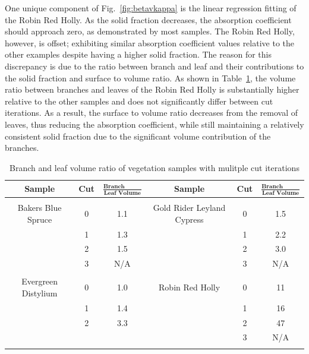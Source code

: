 \documentclass[12pt]{article}
\newcommand*\textfrac[2]{
  \frac{\textbf{#1}}{\textbf{#2}}
}
\begin{document}
One unique component of Fig.~\ref{fig:betavkappa} is the linear regression fitting of the Robin Red Holly. As the solid fraction decreases, the absorption coefficient should approach zero, as demonstrated by most samples. The Robin Red Holly, however, is offset; exhibiting similar absorption coefficient values relative to the other examples despite having a higher solid fraction. The reason for this discrepancy is due to the ratio between branch and leaf and their contributions to the solid fraction and surface to volume ratio. As shown in Table~\ref{tab:RatioTable}, the volume ratio between branches and leaves of the Robin Red Holly is substantially higher relative to the other samples and does not significantly differ between cut iterations. As a result, the surface to volume ratio decreases from the removal of leaves, thus reducing the absorption coefficient, while still maintaining a relatively consistent solid fraction due to the significant volume contribution of the branches.  

\begin{table}[!]
\caption[Branch and leaf volume ratio of vegetation samples]{Branch and leaf volume ratio of vegetation samples with mulitple cut iterations}
\label{tab:RatioTable}
\centering
	
	\begin{tabular}{cccccc}	
			\hline
\rule{0pt}{14pt}\textbf{Sample}	&\textbf{Cut}	& ${\textfrac{Branch Volume}{Leaf Volume}}$ 	&\textbf{Sample}			&	\textbf{Cut}	& $\textfrac{Branch Volume}{Leaf Volume}$	\\
\hline
\\[0.01cm]
Bakers Blue Spruce			&	0		&        1.1							&Gold Rider Leyland Cypress	&	0		&	1.5						\\
					&	1		& 	1.3							&					&	1		&	2.2						\\
					&	2		& 	1.5							&					&	2		&	3.0						\\
					&	3		&	N/A							&					&	3		&  	N/A 						\\
					&			&								&					&			&       							\\
Evergreen Distylium			&	0		&	1.0							&Robin Red Holly			&	0		&	11						\\
					&	1		&	1.4							&					&	1		&	16						\\
					&	2		&	3.3							&					&	2		&	47						\\
					&			&								&					&	3		&        N/A 						\\
\\[0.005cm]
\hline														

\end{tabular}
\end{table}
\end{document}
